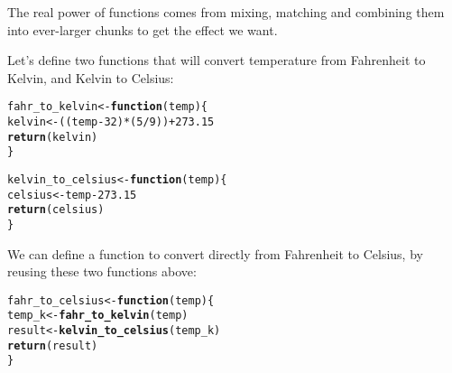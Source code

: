 \documentclass[12pt,a4paper]{scrartcl}\usepackage[]{graphicx}\usepackage[]{color}
\makeatletter
\newcommand{\hlnum}[1]{\textcolor[rgb]{0.686,0.059,0.569}{#1}}%
\newcommand{\hlopt}[1]{\textcolor[rgb]{0,0,0}{#1}}%
\newcommand{\hlstd}[1]{\textcolor[rgb]{0.345,0.345,0.345}{#1}}%
\newcommand{\hlkwa}[1]{\textcolor[rgb]{0.161,0.373,0.58}{\textbf{#1}}}%
\newcommand{\hlkwb}[1]{\textcolor[rgb]{0.69,0.353,0.396}{#1}}%
\newcommand{\hlkwc}[1]{\textcolor[rgb]{0.333,0.667,0.333}{#1}}%
\newcommand{\hlkwd}[1]{\textcolor[rgb]{0.737,0.353,0.396}{\textbf{#1}}}%
\newenvironment{kframe}{%
 \def\at@end@of@kframe{}%
 \ifinner\ifhmode%
  \def\at@end@of@kframe{\end{minipage}}%
  \begin{minipage}{\columnwidth}%
 \fi\fi%
 \def\FrameCommand##1{\hskip\@totalleftmargin \hskip-\fboxsep
 \colorbox{shadecolor}{##1}\hskip-\fboxsep
     \hskip-\linewidth \hskip-\@totalleftmargin \hskip\columnwidth}%
 \MakeFramed {\advance\hsize-\width
   \@totalleftmargin\z@ \linewidth\hsize
   \@setminipage}}%
 {\par\unskip\endMakeFramed%
 \at@end@of@kframe}
\newenvironment{knitrout}{}{} %
\makeatother
\begin{document}
The real power of functions comes from mixing, matching and combining them into ever-larger chunks to get the effect we want.

Let’s define two functions that will convert temperature from Fahrenheit to Kelvin, and Kelvin to Celsius:

\begin{knitrout}
\color{fgcolor}\begin{kframe}
\begin{alltt}
\hlstd{fahr_to_kelvin} \hlkwb{<-} \hlkwa{function}\hlstd{(}\hlkwc{temp}\hlstd{) \{}
  \hlstd{kelvin} \hlkwb{<-} \hlstd{((temp} \hlopt{-} \hlnum{32}\hlstd{)} \hlopt{*} \hlstd{(}\hlnum{5} \hlopt{/} \hlnum{9}\hlstd{))} \hlopt{+} \hlnum{273.15}
  \hlkwd{return}\hlstd{(kelvin)}
\hlstd{\}}

\hlstd{kelvin_to_celsius} \hlkwb{<-} \hlkwa{function}\hlstd{(}\hlkwc{temp}\hlstd{) \{}
  \hlstd{celsius} \hlkwb{<-} \hlstd{temp} \hlopt{-} \hlnum{273.15}
  \hlkwd{return}\hlstd{(celsius)}
\hlstd{\}}
\end{alltt}
\end{kframe}
\end{knitrout}

We can define a function to convert directly from Fahrenheit to Celsius, by reusing these two functions above:

\begin{knitrout}
\color{fgcolor}\begin{kframe}
\begin{alltt}
\hlstd{fahr_to_celsius} \hlkwb{<-} \hlkwa{function}\hlstd{(}\hlkwc{temp}\hlstd{) \{}
  \hlstd{temp_k} \hlkwb{<-} \hlkwd{fahr_to_kelvin}\hlstd{(temp)}
  \hlstd{result} \hlkwb{<-} \hlkwd{kelvin_to_celsius}\hlstd{(temp_k)}
  \hlkwd{return}\hlstd{(result)}
\hlstd{\}}
\end{alltt}
\end{kframe}
\end{knitrout}
\end{document}
